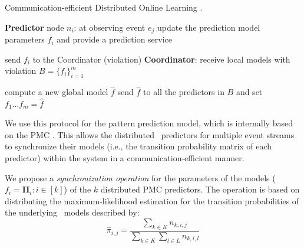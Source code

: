\begin{algorithm}[h]
	\caption{Communication-efficient Distributed Online Learning \cite{kamp2014communication}.} 
	\begin{algorithmic}[1] 
		\Statex \Indm  \textbf{Predictor} node $n_i$: at observing event $e_j$
		\Statex \Indp update the prediction model parameters $f_i$ and provide a prediction service \; 

		\Statex {}  
		\Statex send  $f_i$ to the Coordinator (violation) \;
		\Statex \Indm \textbf{Coordinator}:
		\Statex \Indp receive local models with violation 
		 $B=\{f_i\}_{i=1}^m$ \;
	
	
		\Statex {}
        \Statex
		\Statex compute a new global model $\hat{f}$ \;
		\Statex send $\hat{f}$ to all the predictors in $B$ and set $f_{1}\dots f_{m}=\hat{f} $\; 
		\Statex {}
	
	\end{algorithmic}
	\label{algonline:dol}
\end{algorithm}


\par  We use this protocol for the pattern prediction model, which is internally based on the PMC \pmcmr. This allows the distributed \pmcmr\ predictors for multiple event streams to  synchronize their models (i.e., the transition probability matrix of each predictor) within the system in a communication-efficient manner. 



\par We propose a \textit{synchronization operation} for the parameters of the models ($f_i=\boldsymbol{\Pi}_i :i \in[k]$) of the $k$ distributed PMC predictors. The operation is based on distributing the maximum-likelihood estimation \cite{anderson1957statistical} for the transition probabilities of the underlying \pmcmr\ models described by: 
\begin{equation*}
\label{eq:dis_pi_estim}
\hat{\pi}_{i,j}=\frac{\sum_{k \in K} n_{k,i,j}}{\sum_{k \in K} \sum_{l \in L} n_{k,i,l}}
\end{equation*}

